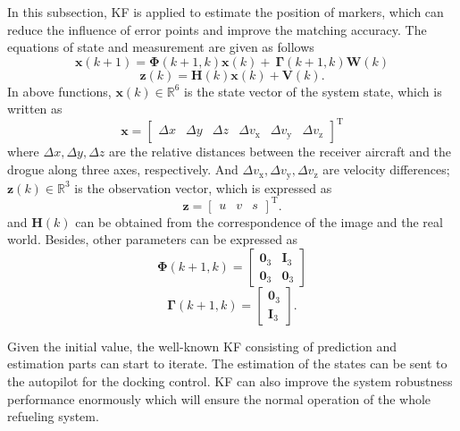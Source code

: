 In this subsection, KF is applied to estimate the position of
markers, which can reduce the influence of error points and improve the
matching accuracy. The equations of state and measurement are
given as follows 
\begin{equation}
\mathbf{x}(k+1)\!=\!\mathbf{\Phi }(k+1,k)\mathbf{x}(k)\!+\!\ \mathbf{\Gamma }%
(k+1,k)\mathbf{W}(k)  \label{eq15}
\end{equation}%
\begin{equation}
\mathbf{z}(k)=\mathbf{H}(k)\mathbf{x}(k)+\mathbf{V}(k).  \label{eq16}
\end{equation}
In above functions, $\mathbf{x}(k)\in \mathbb{R}^{6}$ is the state vector of
the system state, which is written as 
\begin{equation}
\mathbf{x}=
\begin{bmatrix}
\Delta x & \Delta y & \Delta z & \Delta v_{\mathrm{x}} & \Delta v_{\mathrm{y}} & \Delta v_{\mathrm{z}}%
\end{bmatrix}
^{\mathrm{T}}  \label{eq17}
\end{equation}
where $\Delta x,\Delta y,\Delta z$ are the relative distances between the
receiver aircraft and the drogue along three axes, respectively. And $\Delta v_{\mathrm{x}},\Delta v_{\mathrm{y}},\Delta
v_{\mathrm{z}} $ are velocity differences; $\mathbf{z}(k)\in \mathbb{R}^{3}$ is the observation vector, which is expressed as 
\begin{equation}
\mathbf{z}=
\begin{bmatrix}
u & v & s
\end{bmatrix}
^{\mathrm{T}}.  \label{eq23}
\end{equation}
and $\mathbf{H}(k)$ can be obtained from the correspondence of the image and the real world.
Besides, other parameters can be expressed as 
\begin{equation}
\mathbf{\Phi }(k+1,k)=
\begin{bmatrix}
\mathbf{0}_{3} & \mathbf{I}_{3} \\ 
\mathbf{0}_{3} & \mathbf{0}_{3}
\end{bmatrix}
\label{eq18}
\end{equation}
\begin{equation}
\mathbf{\Gamma }(k+1,k)=
\begin{bmatrix}
\mathbf{0}_{3} \\ 
\mathbf{I}_{3}
\end{bmatrix}.
\label{eq20}
\end{equation}

Given the initial value, the well-known KF consisting of prediction and estimation parts can start to
iterate. The estimation of the states can be sent to the autopilot for the docking control. KF can also improve the
system robustness performance enormously which will ensure the normal
operation of the whole refueling system.

